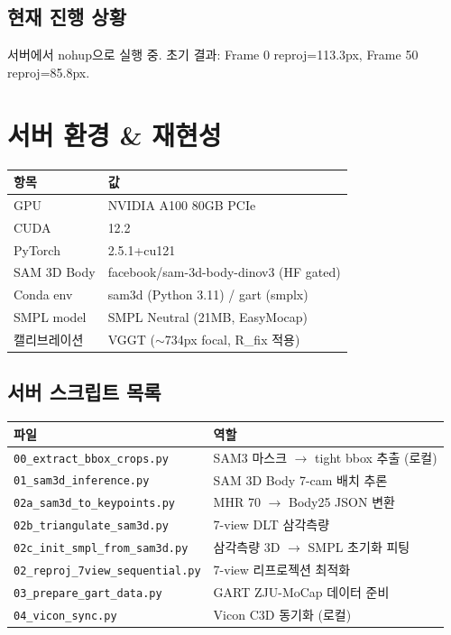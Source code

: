 \documentclass[11pt, a4paper]{article}
\begin{document}
\subsection{현재 진행 상황}

서버에서 nohup으로 실행 중. 초기 결과: Frame 0 reproj=113.3px, Frame 50 reproj=85.8px.

\section{서버 환경 \& 재현성}

\begin{center}
\begin{tabular}{l l}
\toprule
\textbf{항목} & \textbf{값} \\
\midrule
GPU & NVIDIA A100 80GB PCIe \\
CUDA & 12.2 \\
PyTorch & 2.5.1+cu121 \\
SAM 3D Body & facebook/sam-3d-body-dinov3 (HF gated) \\
Conda env & sam3d (Python 3.11) / gart (smplx) \\
SMPL model & SMPL Neutral (21MB, EasyMocap) \\
캘리브레이션 & VGGT ($\sim$734px focal, R\_fix 적용) \\
\bottomrule
\end{tabular}
\end{center}

\subsection{서버 스크립트 목록}

\begin{center}
\begin{tabular}{l l}
\toprule
\textbf{파일} & \textbf{역할} \\
\midrule
\texttt{00\_extract\_bbox\_crops.py} & SAM3 마스크 $\to$ tight bbox 추출 (로컬) \\
\texttt{01\_sam3d\_inference.py} & SAM 3D Body 7-cam 배치 추론 \\
\texttt{02a\_sam3d\_to\_keypoints.py} & MHR 70 $\to$ Body25 JSON 변환 \\
\texttt{02b\_triangulate\_sam3d.py} & 7-view DLT 삼각측량 \\
\texttt{02c\_init\_smpl\_from\_sam3d.py} & 삼각측량 3D $\to$ SMPL 초기화 피팅 \\
\texttt{02\_reproj\_7view\_sequential.py} & 7-view 리프로젝션 최적화 \\
\texttt{03\_prepare\_gart\_data.py} & GART ZJU-MoCap 데이터 준비 \\
\texttt{04\_vicon\_sync.py} & Vicon C3D 동기화 (로컬) \\
\bottomrule
\end{tabular}
\end{center}
\end{document}
